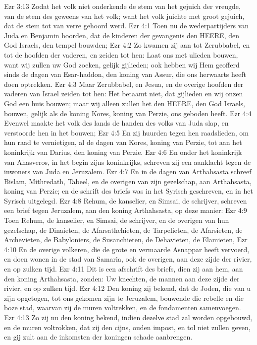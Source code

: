 Ezr 3:13  Zodat het volk niet onderkende de stem van het gejuich der vreugde, van de stem des geweens van het volk; want het volk juichte met groot gejuich, dat de stem tot van verre gehoord werd.
Ezr 4:1  Toen nu de wederpartijders van Juda en Benjamin hoorden, dat de kinderen der gevangenis den HEERE, den God Israels, den tempel bouwden;
Ezr 4:2  Zo kwamen zij aan tot Zerubbabel, en tot de hoofden der vaderen, en zeiden tot hen: Laat ons met ulieden bouwen, want wij zullen uw God zoeken, gelijk gijlieden; ook hebben wij Hem geofferd sinds de dagen van Esar-haddon, den koning van Assur, die ons herwaarts heeft doen optrekken.
Ezr 4:3  Maar Zerubbabel, en Jesua, en de overige hoofden der vaderen van Israel zeiden tot hen: Het betaamt niet, dat gijlieden en wij onzen God een huis bouwen; maar wij alleen zullen het den HEERE, den God Israels, bouwen, gelijk als de koning Kores, koning van Perzie, ons geboden heeft.
Ezr 4:4  Evenwel maakte het volk des lands de handen des volks van Juda slap, en verstoorde hen in het bouwen;
Ezr 4:5  En zij huurden tegen hen raadslieden, om hun raad te vernietigen, al de dagen van Kores, koning van Perzie, tot aan het koninkrijk van Darius, den koning van Perzie.
Ezr 4:6  En onder het koninkrijk van Ahasveros, in het begin zijns koninkrijks, schreven zij een aanklacht tegen de inwoners van Juda en Jeruzalem.
Ezr 4:7  En in de dagen van Arthahsasta schreef Bislam, Mithredath, Tabeel, en de overigen van zijn gezelschap, aan Arthahsasta, koning van Perzie; en de schrift des briefs was in het Syrisch geschreven, en in het Syrisch uitgelegd.
Ezr 4:8  Rehum, de kanselier, en Simsai, de schrijver, schreven een brief tegen Jeruzalem, aan den koning Arthahsasta, op deze manier:
Ezr 4:9  Toen Rehum, de kanselier, en Simsai, de schrijver, en de overigen van hun gezelschap, de Dinaieten, de Afarsathchieten, de Tarpelieten, de Afarsieten, de Archevieten, de Babyloniers, de Susanchieten, de Dehavieten, de Elamieten,
Ezr 4:10  En de overige volkeren, die de grote en vermaarde Asnappar heeft vervoerd, en doen wonen in de stad van Samaria, ook de overigen, aan deze zijde der rivier, en op zulken tijd.
Ezr 4:11  Dit is een afschrift des briefs, dien zij aan hem, aan den koning Arthahsasta, zonden: Uw knechten, de mannen aan deze zijde der rivier, en op zulken tijd.
Ezr 4:12  Den koning zij bekend, dat de Joden, die van u zijn opgetogen, tot ons gekomen zijn te Jeruzalem, bouwende die rebelle en die boze stad, waarvan zij de muren voltrekken, en de fondamenten samenvoegen.
Ezr 4:13  Zo zij nu den koning bekend, indien dezelve stad zal worden opgebouwd, en de muren voltrokken, dat zij den cijns, ouden impost, en tol niet zullen geven, en gij zult aan de inkomsten der koningen schade aanbrengen.
